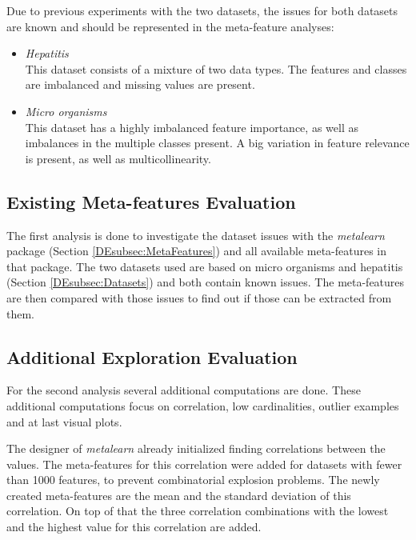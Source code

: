 \documentclass[10pt,a4paper]{report}
\begin{document}
	Due to previous experiments with the two datasets, the issues for both datasets are known and should be represented in the meta-feature analyses:
	
	\begin{itemize}
		\item \textit{Hepatitis} \\ 
		This dataset consists of a mixture of two data types. The features and classes are imbalanced and missing values are present.
		\item \textit{Micro organisms} \\ 
		This dataset has a highly imbalanced feature importance, as well as imbalances in the multiple classes present. A big variation in feature relevance is present, as well as multicollinearity.
	\end{itemize}
	
	\subsection{Existing Meta-features Evaluation}
	\label{DEsubsec:MethodsExistingEvaluation}
	
	The first analysis is done to investigate the dataset issues with the \textit{metalearn} package (Section \ref{DEsubsec:MetaFeatures}) and all available meta-features in that package. The two datasets used are based on micro organisms and hepatitis (Section \ref{DEsubsec:Datasets}) and both contain known issues. The meta-features are then compared with those issues to find out if those can be extracted from them.
	
	\subsection{Additional Exploration Evaluation}
	\label{DEsubsec:MethodsAdditionalEvaluation}	
	
	For the second analysis several additional computations are done. These additional computations focus on correlation, low cardinalities, outlier examples and at last visual plots.
	
	The designer of \textit{metalearn} already initialized finding correlations between the values. The meta-features for this correlation were added for datasets with fewer than 1000 features, to prevent combinatorial explosion problems. The newly created meta-features are the mean and the standard deviation of this correlation. On top of that the three correlation combinations with the lowest and the highest value for this correlation are added.
	
\end{document}
